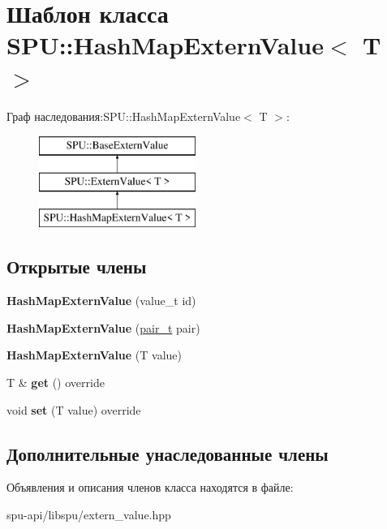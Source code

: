 \hypertarget{class_s_p_u_1_1_hash_map_extern_value}{}\section{Шаблон класса S\+PU\+:\+:Hash\+Map\+Extern\+Value$<$ T $>$}
\label{class_s_p_u_1_1_hash_map_extern_value}
Граф наследования\+:S\+PU\+:\+:Hash\+Map\+Extern\+Value$<$ T $>$\+:\begin{figure}[H]
\begin{center}
\leavevmode
\includegraphics[height=3.000000cm]{class_s_p_u_1_1_hash_map_extern_value}
\end{center}
\end{figure}
\subsection*{Открытые члены}
\begin{DoxyCompactItemize}
\item 
\mbox{\label{class_s_p_u_1_1_hash_map_extern_value_aedfc6561bfed0ccddd500a92d7edeb57}} 
{\bfseries Hash\+Map\+Extern\+Value} (value\+\_\+t id)
\item 
\mbox{\label{class_s_p_u_1_1_hash_map_extern_value_aeb39b3476529c443c306237063ea6d60}} 
{\bfseries Hash\+Map\+Extern\+Value} (\hyperlink{struct_s_p_u_1_1pair__containter}{pair\+\_\+t} pair)
\item 
\mbox{\label{class_s_p_u_1_1_hash_map_extern_value_a2d55cbd44a157910b09f3ef38836c4ae}} 
{\bfseries Hash\+Map\+Extern\+Value} (T value)
\item 
\mbox{\label{class_s_p_u_1_1_hash_map_extern_value_a0d88f76795e84dee2c8c65fb3f4583cc}} 
T \& {\bfseries get} () override
\item 
\mbox{\label{class_s_p_u_1_1_hash_map_extern_value_af8b1efec472cfe183151aa7301941dc5}} 
void {\bfseries set} (T value) override
\end{DoxyCompactItemize}
\subsection*{Дополнительные унаследованные члены}


Объявления и описания членов класса находятся в файле\+:\begin{DoxyCompactItemize}
\item 
spu-\/api/libspu/extern\+\_\+value.\+hpp\end{DoxyCompactItemize}
